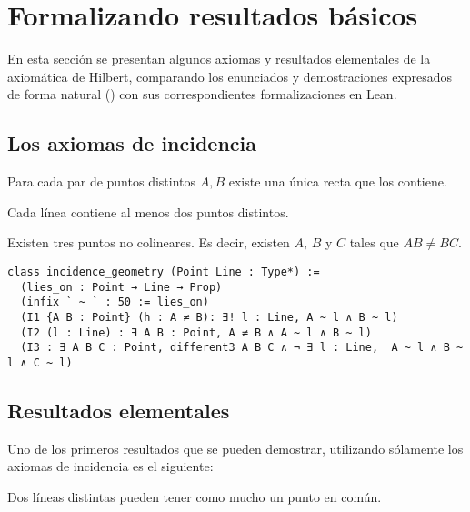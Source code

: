 \section{Formalizando resultados básicos}

En esta sección se presentan algunos axiomas y resultados elementales de la
axiomática de Hilbert, comparando los enunciados y demostraciones expresados de
forma natural () con sus correspondientes
formalizaciones en Lean.

\subsection{Los axiomas de incidencia}



\begin{ax}\label{I1}
    Para cada par de puntos distintos $A, B$ existe una única recta que los
    contiene.
\end{ax}

\begin{ax}\label{I2}
    Cada línea contiene al menos dos puntos distintos.
\end{ax}

\begin{ax}\label{I3}
   Existen tres puntos no colineares. Es decir, existen $A$, $B$ y $C$ tales que
   $AB\neq BC$.
\end{ax}

\begin{lstlisting}
class incidence_geometry (Point Line : Type*) :=
  (lies_on : Point → Line → Prop)
  (infix ` ~ ` : 50 := lies_on)
  (I1 {A B : Point} (h : A ≠ B): ∃! l : Line, A ~ l ∧ B ~ l)
  (I2 (l : Line) : ∃ A B : Point, A ≠ B ∧ A ~ l ∧ B ~ l)
  (I3 : ∃ A B C : Point, different3 A B C ∧ ¬ ∃ l : Line,  A ~ l ∧ B ~ l ∧ C ~ l)
\end{lstlisting}

\subsection{Resultados elementales}

Uno de los primeros resultados que se pueden demostrar, utilizando sólamente los
axiomas de incidencia es el siguiente:

\begin{prop}
    Dos líneas distintas pueden tener como mucho un punto en común.
\end{prop}


